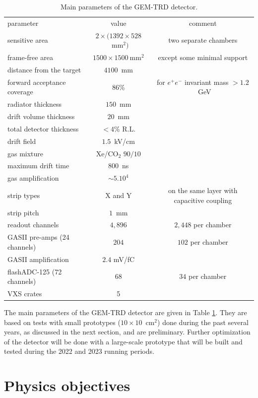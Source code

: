 \documentclass[%
preprint,
nofootinbib,
 amsmath,amssymb,
 aps,
floatfix,
]{revtex4-1}
\begin{document}
\begin{table}[h!]
\begin{ruledtabular}
\begin{tabular}{lcc}
\textrm{parameter}&
\textrm{value}&
\textrm{comment}\\
\colrule
sensitive area & $2 \times (1392 \times 528$~mm$^2)$ & two separate chambers\\
frame-free area & $1500 \times 1500~$mm$^2$ & except some minimal support \\
distance from the target & $4100$~mm & \\
forward acceptance coverage & $86$\% & for $e^+e^-$ invariant mass $>1.2$~GeV \\
radiator thickness & $150$~mm & \\
drift volume thickness & $20$~mm & \\
total detector thickness & $<4$\% R.L. & \\
drift field & $1.5$~kV/cm & \\
gas mixture & Xe/CO$_2$ $90/10$ & \\
maximum drift time & $800$~ns & \\
gas amplification & $\sim 5.10^4$ & \\
strip types & X and Y & on the same layer with capacitive coupling \\
strip pitch & $1$~mm & \\
readout channels & $4,896$ & $2,448$ per chamber \\
GASII pre-amps (24 channels) & $204$ & $102$ per chamber \\
GASII amplification & $2.4$ mV/fC & \\
flashADC-125 (72 channels) & $68$ & $34$ per chamber \\ 
VXS crates & 5 & \\
\end{tabular}
\end{ruledtabular}
\caption{
Main parameters of the GEM-TRD detector.
\label{tab:tech}
}
\end{table}
The main parameters of the GEM-TRD detector are given in Table \ref{tab:tech}.
They are based on tests with small prototypes ($10\times10$~cm$^2$)
done during the past several years, as discussed in the next section,
and are preliminary.
Further optimization of the detector will be done with a large-scale prototype
that will be built and tested during the 2022 and 2023 running periods.

\newpage
\section{Physics objectives}
\end{document}
